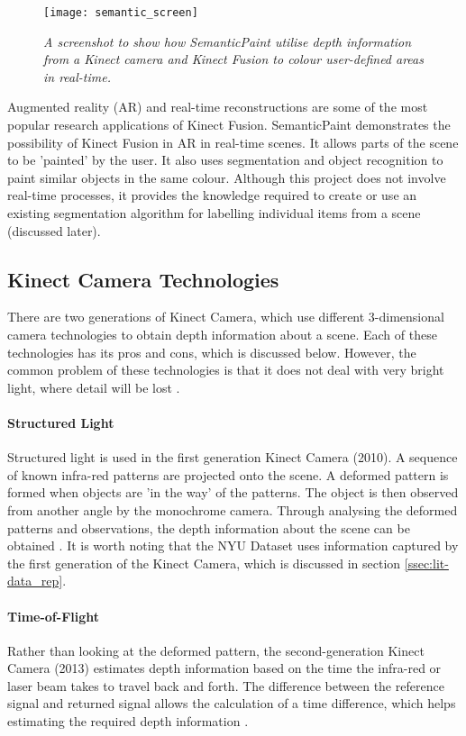 \begin{figure}[h]
  \centering
  \texttt{[image: semantic\_screen]}
  \caption{\textit{A screenshot to show how SemanticPaint utilise depth information from a Kinect camera and Kinect Fusion to colour user-defined areas in real-time. \protect\cite{semantic-paint}}}
  \label{fig:semantic_screen}
\end{figure}

Augmented reality (AR) and real-time reconstructions are some of the most popular research applications of Kinect Fusion. SemanticPaint \cite{semantic-paint} demonstrates the possibility of Kinect Fusion in AR in real-time scenes. It allows parts of the scene to be 'painted' by the user. It also uses segmentation and object recognition to paint similar objects in the same colour. Although this project does not involve real-time processes, it provides the knowledge required to create or use an existing segmentation algorithm for labelling individual items from a scene (discussed later). 

\subsection{Kinect Camera Technologies}
There are two generations of Kinect Camera, which use different 3-dimensional camera technologies to obtain depth information about a scene. Each of these technologies has its pros and cons, which is discussed below. However, the common problem of these technologies is that it does not deal with very bright light, where detail will be lost \cite{chi-book}. 

\paragraph*{Structured Light}
Structured light is used in the first generation Kinect Camera (2010). A sequence of known infra-red patterns are projected onto the scene. A deformed pattern is formed when objects are 'in the way' of the patterns. The object is then observed from another angle by the monochrome camera. Through analysing the deformed patterns and observations, the depth information about the scene can be obtained \cite{chi-book}\cite{kinect-cam-tech}. It is worth noting that the NYU Dataset \cite{nyu-dataset} uses information captured by the first generation of the Kinect Camera, which is discussed in section \ref{ssec:lit-data_rep}.

\paragraph*{Time-of-Flight}
Rather than looking at the deformed pattern, the second-generation Kinect Camera (2013) estimates depth information based on the time the infra-red or laser beam takes to travel back and forth. The difference between the reference signal and returned signal allows the calculation of a time difference, which helps estimating the required depth information \cite{chi-book}.  

